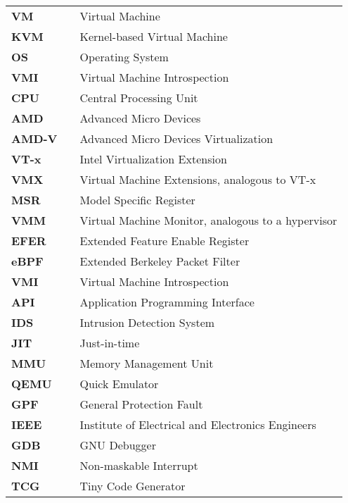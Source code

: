 \documentclass{report}
\begin{document}
\begin{spacing}{1.5}
\begin{tabular}{lcl}
\large{\bf VM}  & & \large{Virtual Machine} \\
\large{\bf KVM}  & & \large{Kernel-based Virtual Machine} \\
\large{\bf OS}   & & \large{Operating System}        \\
\large{\bf VMI}  & & \large{Virtual Machine Introspection} \\
\large{\bf CPU}  & & \large{Central Processing Unit} \\
\large{\bf AMD}  & & \large{Advanced Micro Devices} \\
\large{\bf AMD-V}  & & \large{Advanced Micro Devices Virtualization} \\
\large{\bf VT-x}  & & \large{Intel Virtualization Extension} \\
\large{\bf VMX}  & & \large{Virtual Machine Extensions, analogous to VT-x} \\
\large{\bf MSR}  & & \large{Model Specific Register} \\
\large{\bf VMM}  & & \large{Virtual Machine Monitor, analogous to a hypervisor} \\
\large{\bf EFER}  & & \large{Extended Feature Enable Register} \\
\large{\bf eBPF}  & & \large{Extended Berkeley Packet Filter} \\
\large{\bf VMI}  & & \large{Virtual Machine Introspection} \\
\large{\bf API}  & & \large{Application Programming Interface} \\
\large{\bf IDS}  & & \large{Intrusion Detection System} \\
\large{\bf JIT}  & & \large{Just-in-time} \\
\large{\bf MMU}  & & \large{Memory Management Unit} \\
\large{\bf QEMU}  & & \large{Quick Emulator} \\
\large{\bf GPF}  & & \large{General Protection Fault} \\
\large{\bf IEEE}  & & \large{Institute of Electrical and Electronics Engineers} \\
\large{\bf GDB}  & & \large{GNU Debugger} \\
\large{\bf NMI}  & & \large{Non-maskable Interrupt} \\
\large{\bf TCG}  & & \large{Tiny Code Generator} \\
\end{tabular}















\end{spacing}
\end{document}
